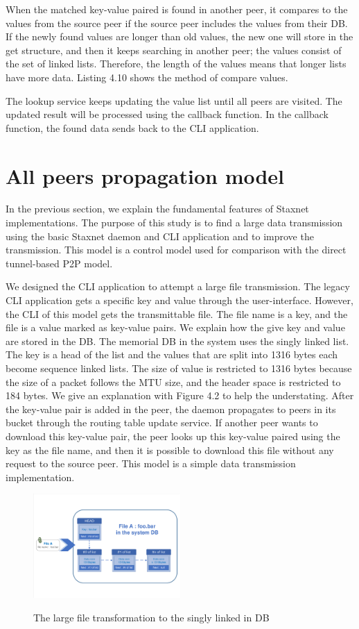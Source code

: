 When the matched key-value paired is found in another peer, it compares to the values from the source peer if the source peer includes the values from their DB. If the newly found values are longer than old values, the new one will store in the get structure, and then it keeps searching in another peer; the values consist of the set of linked lists. Therefore, the length of the values means that longer lists have more data. Listing 4.10 shows the method of compare values.

The lookup service keeps updating the value list until all peers are visited. The updated result will be processed using the callback function. In the callback function, the found data sends back to the CLI application.

\section{All peers propagation model}
In the previous section, we explain the fundamental features of Staxnet implementations. The purpose of this study is to find a large data transmission using the basic Staxnet daemon and CLI application and to improve the transmission. This model is a control model used for comparison with the direct tunnel-based P2P model. 

We designed the CLI application to attempt a large file transmission. The legacy CLI application gets a specific key and value through the user-interface. However, the CLI of this model gets the transmittable file. The file name is a key, and the file is a value marked as key-value pairs. We explain how the give key and value are stored in the DB. The memorial DB in the system uses the singly linked list. The key is a head of the list and the values that are split into 1316 bytes each become sequence linked lists.
The size of value is restricted to 1316 bytes because the size of a packet follows the MTU size, and the header space is restricted to 184 bytes. We give an explanation with Figure 4.2 to help the understating. After the key-value pair is added in the peer, the daemon propagates to peers in its bucket through the routing table update service. If another peer wants to download this key-value pair, the peer looks up this key-value paired using the key as the file name, and then it is possible to download this file without any request to the source peer. This model is a simple data transmission implementation.

\begin{figure}[!ht]
	\centering
	\includegraphics[width=0.5\textwidth]{images/fig_4_2.pdf}\\
	\caption{The large file transformation to the singly linked in DB}
	\label{fig:DB}
\end{figure}


